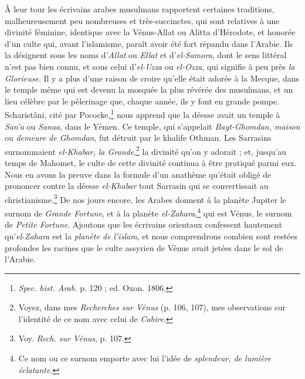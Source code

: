 \documentclass{article}
\begin{document}
À leur tour les écrivains arabes musulmans rapportent certaines traditions, malheureusement peu nombreuses et très-succinctes, qui sont relatives à une divinité féminine, identique avec la Vénus-Allat ou Alitta d'Hérodote, et honorée d'un culte qui, avant l'islamisme, paraît avoir été fort répandu dans l'Arabie. Ils la désignent sous les noms d'\emph{Allat} ou \emph{Ellat} et d'\emph{el-Samora}, dont le sens littéral n'est pas bien connu, et sous celui d'\emph{el-Uzza} ou \emph{el-Ozza}, qui signifie à peu près \emph{la Glorieuse}. Il y a plus d'une raison de croire qu'elle était adorée à la Mecque, dans le temple même qui est devenu la mosquée la plus révérée des musulmans, et un lieu célèbre par le pèlerinage que, chaque année, ils y font en grande pompe. Scharistâni, cité par Pococke,\footnote{\emph{Spec. hist. Arab.} p. 120 ; ed. Oxon. 1806.} nous apprend que la déesse avait un temple à \emph{San'a} ou \emph{Sanaa}, dans le Yémen. Ce temple, qui s'appelait \emph{Bayt-Ghomdan, maison} ou \emph{demeure de Ghomdan}, fut détruit par le khalife Othman. Les Sarrasins surnommaient \emph{el-Khabar, la Grande},\footnote{Voyez, dans mes \emph{Recherches sur Vénus} (p. 106, 107), mes observations sur l'identité de ce nom avec celui de \emph{Cabire}.} la divinité qu'on y adorait ; et, jusqu'au temps de Mahomet, le culte de cette divinité continua à être pratiqué parmi eux. Nous en avons la preuve dans la formule d'un anathème qu'était obligé de prononcer contre la déesse \emph{el-Khabar} tout Sarrasin qui se convertissait au christianisme.\footnote{Voy. \emph{Rech. sur Vénus}, p. 107.} De nos jours encore, les Arabes donnent à la planète Jupiter le surnom de \emph{Grande Fortune}, et à la planète \emph{el-Zahara},\footnote{Ce nom ou ce surnom emporte avec lui l'idée de \emph{splendeur, de lumière éclatante}.} qui est Vénus, le surnom de \emph{Petite Fortune}. Ajoutons que les écrivains orientaux confessent hautement qu'\emph{el-Zahara} est la \emph{planète de l'islam}, et nous comprendrons combien sont restées profondes les racines que le culte assyrien de Vénus avait jetées dans le sol de l'Arabie.
\end{document}
